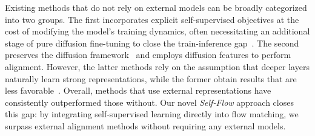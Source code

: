 Existing methods that do not rely on external models can be broadly categorized into two groups. The first incorporates explicit self-supervised objectives at the cost of modifying the model's training dynamics, often necessitating an additional stage of pure diffusion fine-tuning to close the train-inference gap~\citep{maskdit,mdt,Chen2025MaskedAA,zhu2024sd}. The second preserves the diffusion framework~\citep{sra,dispersiveloss,haghighi2025layersyncselfaligningintermediatelayers} and employs diffusion features to perform alignment. However, the latter methods rely on the assumption that deeper layers naturally learn strong representations, while the former obtain results that are less favorable~\citep{dispersiveloss,maskdit,mdt}.
Overall, methods that use external representations have consistently outperformed those without. Our novel \emph{Self-Flow} approach closes this gap: by integrating self-supervised learning directly into flow matching, we surpass external alignment methods without requiring any external models.  